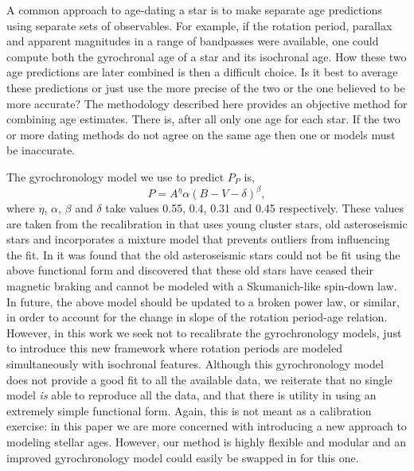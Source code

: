 A common approach to age-dating a star is to make separate age predictions
using separate sets of observables.
For example, if the rotation period, parallax and apparent magnitudes in a
range of bandpasses were available, one could compute both the gyrochronal age
of a star and its isochronal age.
How these two age predictions are later combined is then a difficult choice.
Is it best to average these predictions or just use the more precise of the
two or the one believed to be more accurate?
The methodology described here provides an objective method for combining age
estimates.
There is, after all only one age for each star.
If the two or more dating methods do not agree on the same age then one or
models must be inaccurate.

The gyrochronology model we use to predict $P_P$ is, %
\begin{equation}
    P = A^\eta \alpha (B-V - \delta)^\beta,
\end{equation}
\label{eqn:gyro}
where $\eta$, $\alpha$, $\beta$ and $\delta$ take values 0.55, 0.4, 0.31 and
0.45 respectively.
These values are taken from the recalibration in \citet{angus2015} that uses
young cluster stars, old asteroseismic stars and incorporates a mixture model
that prevents outliers from influencing the fit.
In \citet{angus2015} it was found that the old asteroseismic stars could not
be fit using the above functional form and \citet{vansaders2016} discovered
that these old stars have ceased their magnetic braking and cannot be modeled
with a Skumanich-like spin-down law.
In future, the above model should be updated to a broken power law, or
similar, in order to account for the change in slope of the rotation
period-age relation.
However, in this work we seek not to recalibrate the gyrochronology models,
just to introduce this new framework where rotation periods are modeled
simultaneously with isochronal features.
Although this gyrochronology model does not provide a good fit to all the
available data, we reiterate that no single model {\it is} able to reproduce
all the data, and that there is utility in using an extremely simple
functional form.
Again, this is not meant as a calibration exercise: in this paper we are more
concerned with introducing a new approach to modeling stellar ages.
However, our method is highly flexible and modular and an improved
gyrochronology model could easily be swapped in for this one.

